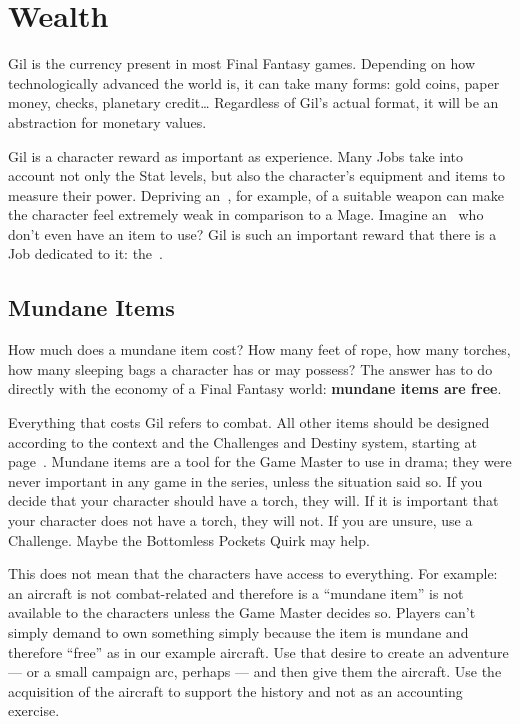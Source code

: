 \section{Wealth}

\begin{multicols}{2}\label{sec:inv-wealth}
Gil is the currency present in most Final Fantasy games. Depending on how technologically advanced the world is, it can take many forms: gold coins, paper money, checks, planetary credit\ldots{} Regardless of Gil’s actual format, it will be an abstraction for monetary values.

Gil is a character reward as important as experience. Many Jobs take into account not only the Stat levels, but also the character’s equipment and items to measure their power. Depriving an~, for example, of a suitable weapon can make the character feel extremely weak in comparison to a Mage. Imagine an~ who don’t even have an item to use? Gil is such an important reward that there is a Job dedicated to it: the~.

\subsection{Mundane Items}\label{subsec:inv-mundane}
How much does a mundane item cost? How many feet of rope, how many torches, how many sleeping bags a character has or may possess? The answer has to do directly with the economy of a Final Fantasy world: \textbf{mundane items are free}.

Everything that costs Gil refers to combat. All other items should be designed according to the context and the Challenges and Destiny system, starting at page~\pageref{ch:engine}. Mundane items are a tool for the Game Master to use in drama; they were never important in any game in the series, unless the situation said so. If you decide that your character should have a torch, they will. If it is important that your character does not have a torch, they will not. If you are unsure, use a Challenge. Maybe the Bottomless Pockets Quirk may help.

This does not mean that the characters have access to everything. For example: an aircraft is not combat-related and therefore is a ``mundane item'' is not available to the characters unless the Game Master decides so. Players can’t simply demand to own something simply because the item is mundane and therefore ``free'' as in our example aircraft. Use that desire to create an adventure --- or a small campaign arc, perhaps --- and then give them the aircraft. Use the acquisition of the aircraft to support the history and not as an accounting exercise.


\end{multicols}
